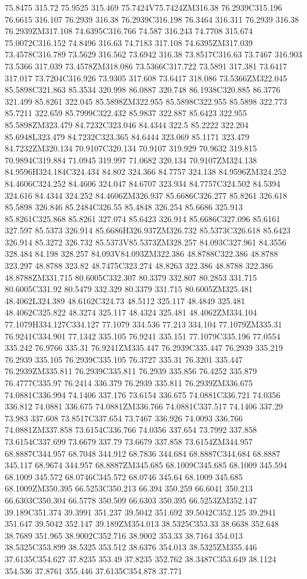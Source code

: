 75.8475 315.72 75.9525 315.469 75.7424V75.7424ZM316.38 76.2939C315.196 76.6615 316.107 76.2939 316.38 76.2939C316.198 76.3464 316.311 76.2939 316.38 76.2939ZM317.108 74.6395C316.766 74.587 316.243 74.7708 315.674 75.0072C316.152 74.8496 316.63 74.7183 317.108 74.6395ZM317.039 73.4578C316.789 73.5629 316.562 73.6942 316.38 73.8517C316.63 73.7467 316.903 73.5366 317.039 73.4578ZM318.086 73.5366C317.722 73.5891 317.381 73.6417 317.017 73.7204C316.926 73.9305 317.608 73.6417 318.086 73.5366ZM322.045 85.5898C321.863 85.3534 320.998 86.0887 320.748 86.1938C320.885 86.3776 321.499 85.8261 322.045 85.5898ZM322.955 85.5898C322.955 85.5898 322.773 85.7211 322.659 85.7999C322.432 85.9837 322.887 85.6423 322.955 85.5898ZM323.479 84.7232C323.046 84.4344 322.5 85.2222 322.204 85.6948L323.479 84.7232C323.365 84.6444 323.069 85.1171 323.479 84.7232ZM320.134 70.9107C320.134 70.9107 319.929 70.9632 319.815 70.9894C319.884 71.0945 319.997 71.0682 320.134 70.9107ZM324.138 84.9596H324.184C324.434 84.802 324.366 84.7757 324.138 84.9596ZM324.252 84.4606C324.252 84.4606 324.047 84.6707 323.934 84.7757C324.502 84.5394 324.616 84.4344 324.252 84.4606ZM326.937 85.6686C326.277 85.8261 326.618 85.5898 326.846 85.2484C326.55 85.4848 326.254 85.6686 325.913 85.8261C325.868 85.8261 327.074 85.6423 326.914 85.6686C327.096 85.6161 327.597 85.5373 326.914 85.6686H326.937ZM326.732 85.5373C326.618 85.6423 326.914 85.3272 326.732 85.5373V85.5373ZM328.257 84.093C327.961 84.3556 328.484 84.198 328.257 84.093V84.093ZM322.386 48.8788C322.386 48.8788 323.297 48.8788 323.82 48.7475C323.274 48.8263 322.386 48.8788 322.386 48.8788ZM331.715 80.6005C332.307 80.3379 332.807 80.2853 331.715 80.6005C331.92 80.5479 332.329 80.3379 331.715 80.6005ZM325.481 48.4062L324.389 48.6162C324.73 48.5112 325.117 48.4849 325.481 48.4062C325.822 48.3274 325.117 48.4324 325.481 48.4062ZM334.104 77.1079H334.127C334.127 77.1079 334.536 77.213 334.104 77.1079ZM335.31 76.9241C334.901 77.1342 335.105 76.9241 335.151 77.1079C335.196 77.0554 335.242 76.9766 335.31 76.9241ZM335.447 76.2939C335.447 76.2939 335.219 76.2939 335.105 76.2939C335.105 76.3727 335.31 76.3201 335.447 76.2939ZM335.811 76.2939C335.811 76.2939 335.856 76.4252 335.879 76.4777C335.97 76.2414 336.379 76.2939 335.811 76.2939ZM336.675 74.0881C336.994 74.1406 337.176 73.6154 336.675 74.0881C336.721 74.0356 336.812 74.0881 336.675 74.0881ZM336.766 74.0881C337.517 74.1406 337.29 73.983 337.608 73.8517C337.654 73.7467 336.926 74.0093 336.766 74.0881ZM337.858 73.6154C336.766 74.0356 337.654 73.7992 337.858 73.6154C337.699 73.6679 337.79 73.6679 337.858 73.6154ZM344.957 68.8887C344.957 68.7048 344.912 68.7836 344.684 68.8887C344.684 68.8887 345.117 68.9674 344.957 68.8887ZM345.685 68.1009C345.685 68.1009 345.594 68.1009 345.572 68.0746C345.572 68.0746 345.64 68.1009 345.685 68.1009ZM350.395 66.5253C350.213 66.394 350.259 66.6041 350.213 66.6303C350.304 66.5778 350.509 66.6303 350.395 66.5253ZM352.147 39.189C351.374 39.3991 351.237 39.5042 351.692 39.5042C352.125 39.2941 351.647 39.5042 352.147 39.189ZM354.013 38.5325C353.33 38.6638 352.648 38.7689 351.965 38.9002C352.716 38.9002 353.33 38.7164 354.013 38.5325C353.899 38.5325 353.512 38.6376 354.013 38.5325ZM355.446 37.6135C354.627 37.8235 353.49 37.8235 352.762 38.3487C353.649 38.1124 354.536 37.8761 355.446 37.6135C354.878 37.771 